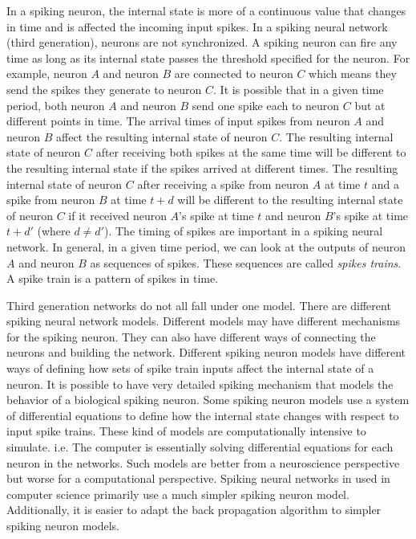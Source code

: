 \documentclass[12pt,A4]{article}
\begin{document}
In a spiking neuron, the internal state is more of a continuous value that changes in time and is
affected the incoming input spikes. In a spiking neural network (third generation), neurons are
not synchronized. A spiking neuron can fire any time as long as its internal state passes the 
threshold specified for the neuron.  For example, neuron $A$ and neuron $B$ are connected to neuron
$C$ which means they send the spikes they generate to neuron $C$. It is possible that in a given 
time period, both neuron $A$ and neuron $B$ send one spike each to neuron $C$ but at different 
points in time. The arrival times of input spikes from neuron $A$ and neuron $B$ affect the resulting
internal state of neuron $C$. The resulting internal state of neuron $C$ after receiving both
spikes at the same time will be different to the resulting internal state if the spikes arrived at
different times. The resulting internal state of neuron $C$ after receiving a spike from neuron $A$
at time $t$ and a spike from neuron $B$ at time $t+d$ will be different to the resulting internal 
state of neuron $C$ if it received neuron $A$'s spike at time $t$ and neuron $B$'s spike at time $t+d'$
(where $d \neq d'$). The timing of spikes are important in a spiking neural network. In general, in
a given time period, we can look at the outputs of neuron $A$ and neuron $B$ as sequences of
spikes. These sequences are called \emph{spikes trains}. A spike train is a pattern of spikes
in time.

Third generation networks do not all fall under one model. There are different spiking neural 
network models. Different models may have different mechanisms for the spiking neuron. They can also
have different ways of connecting the neurons and building the network. Different spiking neuron 
models have different ways of defining how sets of spike train inputs affect the internal state of
a neuron. It is possible to have very detailed spiking mechanism that models the behavior of a
biological spiking neuron. Some spiking neuron models use a system of differential equations to 
define how the internal state changes with respect to input spike trains. These kind of models are
computationally intensive to simulate. i.e. The computer is essentially solving differential 
equations for each neuron in the networks. Such models are better from a neuroscience perspective 
but worse for a computational perspective. Spiking neural networks in used in computer science 
primarily use a much simpler spiking neuron model. Additionally, it is easier to adapt the back
propagation algorithm to simpler spiking neuron models.
\end{document}
